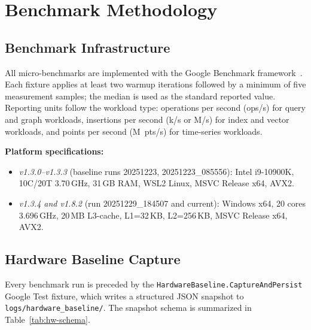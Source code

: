 \documentclass[conference]{IEEEtran}
\begin{document}
\section{Benchmark Methodology}
\label{sec:method}

\subsection{Benchmark Infrastructure}
\label{ssec:infra}

All micro-benchmarks are implemented with the Google Benchmark
framework~\cite{GoogleBenchmark}.
Each fixture applies at least two warmup iterations followed by a
minimum of five measurement samples; the median is used as the
standard reported value.
Reporting units follow the workload type: operations per second
(ops/s) for query and graph workloads, insertions per second (k/s or
M/s) for index and vector workloads, and points per second (M~pts/s)
for time-series workloads.

\textbf{Platform specifications:}
\begin{itemize}
  \item \emph{v1.3.0--v1.3.3} (baseline runs 20251223,
        20251223\_085556): Intel i9-10900K, 10C/20T \@ 3.70\,GHz,
        31\,GB RAM, WSL2 Linux, MSVC Release x64, AVX2.
  \item \emph{v1.3.4 and v1.8.2} (run 20251229\_184507 and current):
        Windows x64, 20 cores \@ 3.696\,GHz, 20\,MB L3-cache,
        L1=32\,KB, L2=256\,KB, MSVC Release x64, AVX2.
\end{itemize}

\subsection{Hardware Baseline Capture}
\label{ssec:hw-baseline}

Every benchmark run is preceded by the
\texttt{HardwareBaseline.CaptureAndPersist} Google Test fixture, which
writes a structured JSON snapshot to
\texttt{logs/hardware\_baseline/}.
The snapshot schema is summarized in Table~\ref{tab:hw-schema}.
\end{document}
